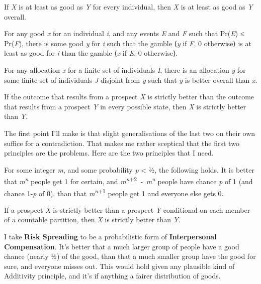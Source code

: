 \documentclass[
  letterpaper,
  DIV=11,
  numbers=noendperiod]{scrartcl}
\providecommand{\tightlist}{%
  \setlength{\itemsep}{0pt}\setlength{\parskip}{0pt}}
\begin{document}
\begin{description}
\tightlist
\item[(Weak) Ex Ante Pareto]
If \emph{X} is at least as good as \emph{Y} for every individual, then
\emph{X} is at least as good as \emph{Y} overall.
\item[Stochastic Compensation]
For any good \emph{x} for an individual \emph{i}, and any events
\emph{E} and \emph{F} such that Pr(\emph{E}) ≤ Pr(\emph{F}), there is
some good \emph{y} for \emph{i} such that the gamble ⟨\emph{y} if
\emph{F}, 0 otherwise⟩ is at least as good for \emph{i} than the gamble
⟨\emph{x} if \emph{E}, 0 otherwise⟩.
\item[Interpersonal Compensation]
For any allocation \emph{x} for a finite set of individuals \emph{I},
there is an allocation \emph{y} for some finite set of individuals
\emph{J} disjoint from \emph{y} such that \emph{y} is better overall
than \emph{x}.
\item[(Strict) Statewise Dominance]
If the outcome that results from a prospect \emph{X} is strictly better
than the outcome that results from a prospect \emph{Y} in every possible
state, then \emph{X} is strictly better than \emph{Y}.
\end{description}

The first point I'll make is that slight generalisations of the last two
on their own suffice for a contradiction. That makes me rather sceptical
that the first two principles are the problems. Here are the two
principles that I need.

\begin{description}
\tightlist
\item[Risk Spreading]
For some integer \emph{m}, and some probability \emph{p} \textless{} ½,
the following holds. It is better that \emph{m\textsuperscript{n}}
people get 1 for certain, and
\emph{m}\textsuperscript{\emph{n}+2}~‑~\emph{m\textsuperscript{n}}
people have chance \emph{p} of 1 (and chance 1‑\emph{p} of 0), than that
\emph{m}\textsuperscript{\emph{n}+1} people get 1 and everyone else gets
0.
\item[(Strict) Partition Dominance]
If a prospect \emph{X} is strictly better than a prospect \emph{Y}
conditional on each member of a countable partition, then \emph{X} is
strictly better than \emph{Y}.
\end{description}

I take \textbf{Risk Spreading} to be a probabilistic form of
\textbf{Interpersonal Compensation}. It's better that a much larger
group of people have a good chance (nearly ½) of the good, than that a
much smaller group have the good for sure, and everyone misses out. This
would hold given any plausible kind of Additivity principle, and it's if
anything a fairer distribution of goods.
\end{document}
